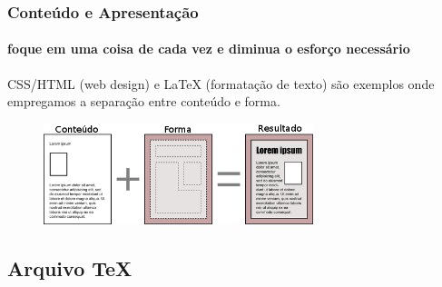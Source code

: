 \begin{frame}
\frametitle{Conteúdo e Apresentação}
\framesubtitle{foque em uma coisa de cada vez e diminua o esforço necessário}
  CSS/HTML (web design) e \LaTeX{} (formatação de texto) são exemplos onde empregamos a separação entre conteúdo e forma.
  \begin{figure}[h!]
  \centering
  \includegraphics[width=0.7\textwidth,height=0.7\textheight,keepaspectratio]{figures/content_design.png}
  \label{fig:content_design}
  \end{figure}
\end{frame}



\subsection{Arquivo \TeX{}}\label{sec:tex}






